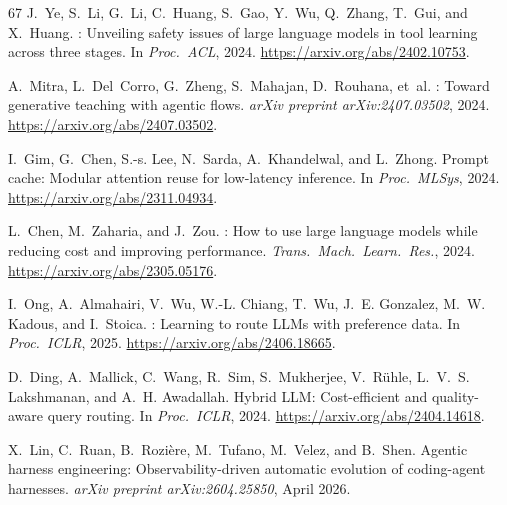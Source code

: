 \documentclass[11pt,a4paper]{article}
\begin{document}
\begin{thebibliography}{67}
J.~Ye, S.~Li, G.~Li, C.~Huang, S.~Gao, Y.~Wu, Q.~Zhang, T.~Gui, and X.~Huang.
: Unveiling safety issues of large language models in tool learning across three stages.
\newblock In \emph{Proc.\ ACL}, 2024.
\newblock \url{https://arxiv.org/abs/2402.10753}.


A.~Mitra, L.~Del~Corro, G.~Zheng, S.~Mahajan, D.~Rouhana, et~al.
: Toward generative teaching with agentic flows.
\newblock \emph{arXiv preprint arXiv:2407.03502}, 2024.
\newblock \url{https://arxiv.org/abs/2407.03502}.


I.~Gim, G.~Chen, S.-s. Lee, N.~Sarda, A.~Khandelwal, and L.~Zhong.
\newblock Prompt cache: Modular attention reuse for low-latency inference.
\newblock In \emph{Proc.\ MLSys}, 2024.
\newblock \url{https://arxiv.org/abs/2311.04934}.

L.~Chen, M.~Zaharia, and J.~Zou.
: How to use large language models while reducing cost and improving performance.
\newblock \emph{Trans.\ Mach.\ Learn.\ Res.}, 2024.
\newblock \url{https://arxiv.org/abs/2305.05176}.

I.~Ong, A.~Almahairi, V.~Wu, W.-L. Chiang, T.~Wu, J.~E. Gonzalez, M.~W. Kadous, and I.~Stoica.
: Learning to route {LLM}s with preference data.
\newblock In \emph{Proc.\ ICLR}, 2025.
\newblock \url{https://arxiv.org/abs/2406.18665}.

D.~Ding, A.~Mallick, C.~Wang, R.~Sim, S.~Mukherjee, V.~R{\"u}hle, L.~V.~S. Lakshmanan, and A.~H. Awadallah.
\newblock Hybrid {LLM}: Cost-efficient and quality-aware query routing.
\newblock In \emph{Proc.\ ICLR}, 2024.
\newblock \url{https://arxiv.org/abs/2404.14618}.

X.~Lin, C.~Ruan, B.~Rozière, M.~Tufano, M.~Velez, and B.~Shen.
\newblock Agentic harness engineering: Observability-driven automatic evolution of coding-agent harnesses.
\newblock \emph{arXiv preprint arXiv:2604.25850}, April 2026.



\end{thebibliography}
\end{document}
